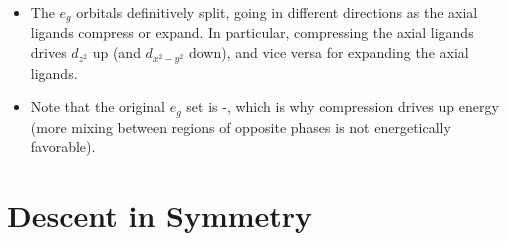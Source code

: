 \documentclass[../notes.tex]{subfiles}
\begin{document}
\begin{itemize}
\begin{itemize}
        \item The $e_g$ orbitals definitively split, going in different directions as the axial ligands compress or expand. In particular, compressing the axial ligands drives $d_{z^2}$ up (and $d_{x^2-y^2}$ down), and vice versa for expanding the axial ligands.
        \item Note that the original $e_g$ set is -, which is why compression drives up energy (more mixing between regions of opposite phases is not energetically favorable).
    \end{itemize}
\end{itemize}



\section{Descent in Symmetry}
\end{document}
